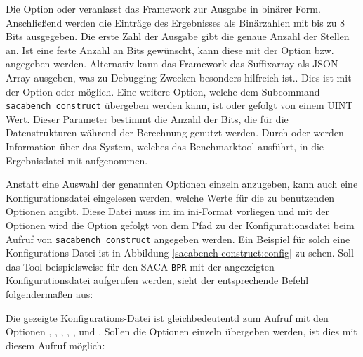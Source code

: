 {Die Option  oder  veranlasst das Framework zur Ausgabe in binärer Form.
Anschließend werden die Einträge des Ergebnisses als Binärzahlen mit bis zu 8 Bits ausgegeben.
Die erste Zahl der Ausgabe gibt die genaue Anzahl der Stellen an.
Ist eine feste Anzahl an Bits gewünscht, kann diese mit der Option  bzw.  angegeben werden.
Alternativ kann das Framework das Suffixarray als JSON-Array ausgeben, was zu Debugging-Zwecken besonders hilfreich ist.. 
Dies ist mit der Option  oder  möglich.
Eine weitere Option, welche dem Subcommand \texttt{sacabench construct} übergeben werden kann, ist  oder  gefolgt von einem UINT Wert. 
Dieser Parameter bestimmt die Anzahl der Bits, die für die Datenstrukturen während der Berechnung genutzt werden.
Durch  oder  werden Information über das System, welches das Benchmarktool ausführt, in die Ergebnisdatei mit aufgenommen.\par
Anstatt eine Auswahl der genannten Optionen einzeln anzugeben, kann auch eine Konfigurationsdatei eingelesen werden, welche Werte für die zu benutzenden Optionen angibt.
Diese Datei muss im im ini-Format vorliegen und mit der Optionen wird die Option  gefolgt von dem Pfad zu der Konfigurationsdatei beim Aufruf von \texttt{sacabench construct} angegeben werden.
Ein Beispiel für solch eine Konfigurations-Datei ist in Abbildung \ref{sacabench-construct:config} zu sehen.
Soll das Tool beispielsweise für den SACA \texttt{BPR} mit der angezeigten Konfigurationsdatei aufgerufen werden, sieht der entsprechende Befehl folgendermaßen aus:


Die gezeigte Konfigurations-Datei ist gleichbedeutentd zum Aufruf mit den Optionen , , , , ,  und .
Sollen die Optionen einzeln übergeben werden, ist dies mit diesem Aufruf möglich:

\par
}

